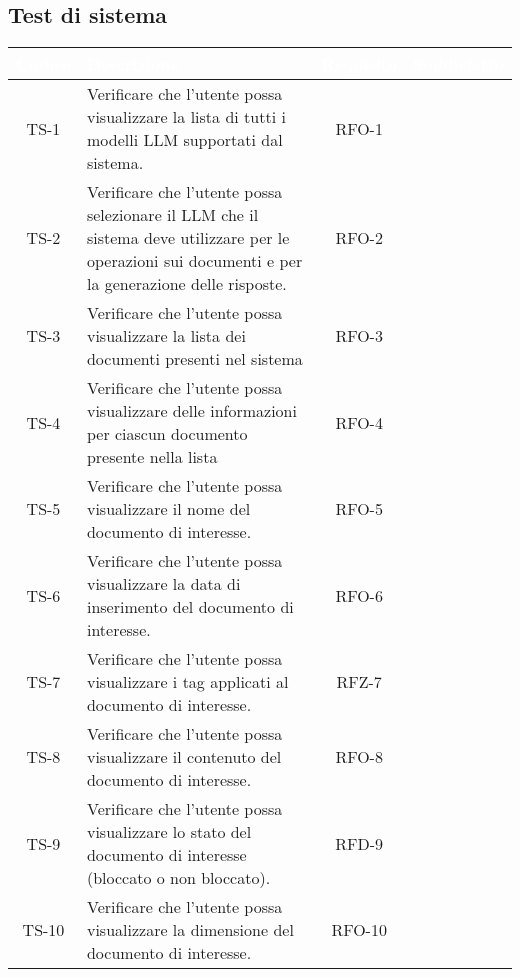 \subsection{Test di sistema}

\begingroup
\setlength{\tabcolsep}{10pt}
\renewcommand{\arraystretch}{1.5}
\begin{xltabular}{\textwidth}{| c | X | c | c |}
    \hline
     \textbf{\textcolor{white}{Codice}} & \textbf{\textcolor{white}{Descrizione}} & \textbf{\textcolor{white}{Requisito}} & \textbf{\textcolor{white}{Soddisfatto}}\\
    \hline
    \endhead
    TS-1 & Verificare che l’utente possa visualizzare la lista di tutti i modelli LLM supportati dal sistema. & RFO-1 & \textcolor{xmarkcolor}{} \\
    \hline
    TS-2 & Verificare che l’utente possa selezionare il LLM che il sistema deve utilizzare per le operazioni sui documenti e per la generazione delle risposte. & RFO-2 & \textcolor{xmarkcolor}{} \\
    \hline
    TS-3 & Verificare che l'utente possa visualizzare la lista dei documenti presenti nel sistema & RFO-3 & \textcolor{xmarkcolor}{} \\
    \hline
    TS-4 & Verificare che l'utente possa visualizzare delle informazioni per ciascun documento presente nella lista & RFO-4 & \textcolor{xmarkcolor}{} \\
    \hline
    TS-5 & Verificare che l’utente possa visualizzare il nome del documento di interesse. & RFO-5 & \textcolor{xmarkcolor}{} \\
    \hline
    TS-6 & Verificare che l’utente possa visualizzare la data di inserimento del documento di interesse. & RFO-6 & \textcolor{xmarkcolor}{} \\
    \hline
    TS-7 & Verificare che l’utente possa visualizzare i tag applicati al documento di interesse. & RFZ-7 & \textcolor{xmarkcolor}{} \\
    \hline
    TS-8 & Verificare che l’utente possa visualizzare il contenuto del documento di interesse. & RFO-8 & \textcolor{xmarkcolor}{} \\
    \hline
    TS-9 & Verificare che l’utente possa visualizzare lo stato del documento di interesse (bloccato o non bloccato). & RFD-9 & \textcolor{xmarkcolor}{} \\
    \hline
    TS-10 &  Verificare che l’utente possa visualizzare la dimensione del documento di interesse. & RFO-10 & \textcolor{xmarkcolor}{} \\

\end{xltabular}
